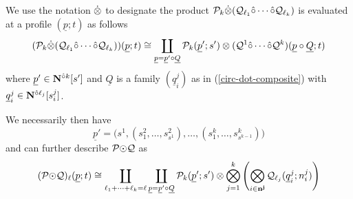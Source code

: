 We use the notation $\dot{\otimes}$ to designate the product $\mathcal{P}_k \dot{\otimes} (\mathcal{Q}_{\ell_1} \hat{\circ} \cdots \hat{\circ} \mathcal{Q}_{\ell_k})$ is evaluated at a profile $(\underline{p};t)$ as follows \[(\Cal{P}_k \tensordot (\Cal{Q}_{\ell_1}\circhat \cdots \circhat \Cal{Q}_{\ell_k})) (\underline{p};t) \cong \coprod_{\underline{p}=\underline{p}' \circ \underline{Q}} \Cal{P}_k(\underline{p}';s') \otimes (\Cal{Q}^1 \circhat \cdots \circhat \Cal{Q}^k)(\underline{p}\circ \underline{Q}; t) %
\] 
where $\underline{p}'\in\mathbf{N}^{\hat{\circ}k}[s']$ and $\underline{Q}$ is a family $(\underline{q}_i^j)$ as in (\ref{circ-dot-composite}) with $\underline{q}_i^j\in\mathbf{N}^{\hat{\circ}\ell_{j}}[s_i^j]$.

We necessarily then have \[\label{s-def}
\underline{p}'=\big(s^1, (s^2_1,\dots,s^2_{s^1}), \dots , (s^k_1,\dots, s^k_{s^{k-1}})\big)\] and can further describe $\mathcal{P} {\odot} \mathcal{Q}$ as \begin{align}\label{p=p'Q} 
    (\mathcal{P} {\odot} \mathcal{Q})_{\ell}(\underline{p};t) \cong \coprod_{\ell_1+\dots+\ell_k=\ell} \coprod_{\underline{p}=\underline{p}' \circ \underline{Q}} \mathcal{P}_k(\underline{p}';s') \otimes \bigotimes_{j=1}^{k} \left( \bigotimes_{i\in\mathbf{n^j}} \mathcal{Q}_{\ell_j}(\underline{q}^j_i;n^j_i) \right)
    \end{align}


